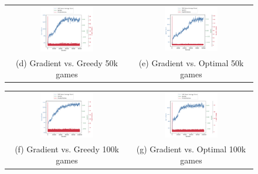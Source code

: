 \documentclass[12pt]{article}
\begin{document}
\begin{figure}[H]
    \begin{tabular}{cc}
        \includegraphics[width=0.45\textwidth]{gradient_greedy.png} &
        \includegraphics[width=0.45\textwidth]{gradient_optimal.png} \\
        (d) Gradient vs. Greedy 50k games &
        (e) Gradient vs. Optimal 50k games \\
    \end{tabular}
\end{figure}

\begin{figure}[H]
    \begin{tabular}{cc}
        \includegraphics[width=0.45\textwidth]{gradient_greedy_long.png} &
        \includegraphics[width=0.45\textwidth]{gradient_optimal_long.png} \\
        (f) Gradient vs. Greedy 100k games &
        (g) Gradient vs. Optimal 100k games
    \end{tabular}
\end{figure}
\end{document}
